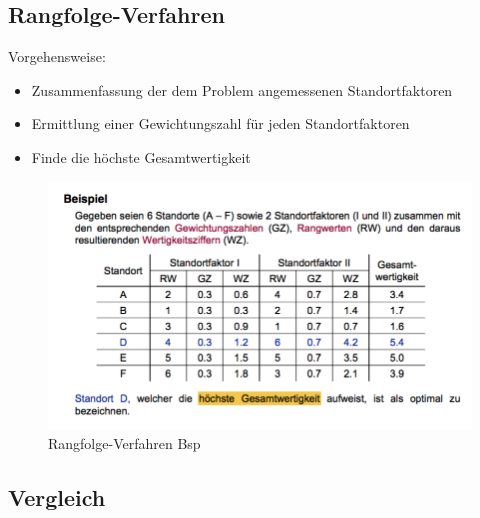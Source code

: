 
    \subsection{Rangfolge-Verfahren} %
    \label{sub:rangfolge_verfahren}

      \par Vorgehensweise:

      \begin{itemize}
        \item Zusammenfassung der dem Problem angemessenen Standortfaktoren
        \item Ermittlung einer Gewichtungszahl für jeden Standortfaktoren
        \item Finde die höchste Gesamtwertigkeit
      \end{itemize}

      \begin{exmp}
        
      \end{exmp}

      \begin{figure}[H]
        \centering
        \includegraphics[width=\textwidth]{Images/Rangfolgen_Verfahren_BSP.png}
        \caption{Rangfolge-Verfahren Bsp}
      \end{figure}

    

    \subsection{Vergleich} %
    \label{sub:vergleich}

